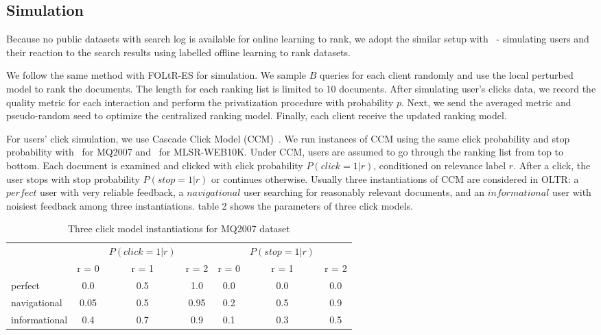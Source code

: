 \subsection{Simulation}

Because no public datasets with search log is available for online learning to rank, we adopt the similar setup with~\cite{DBLP:conf/wsdm/SchuthOWR16, DBLP:conf/wsdm/HofmannSWR13} - simulating users and their reaction to the search results using labelled offline learning to rank datasets.

We follow the same method with FOLtR-ES for simulation. We sample $B$ queries for each client randomly and use the local perturbed model to rank the documents. The length for each ranking list is limited to 10 documents. After simulating user's clicks data, we record the quality metric for each interaction and perform the privatization procedure with probability $p$. Next, we send the averaged metric and pseudo-random seed to optimize the centralized ranking model. Finally, each client receive the updated ranking model. 

For users' click simulation, we use Cascade Click Model (CCM)~\cite{DBLP:conf/wsdm/GuoLW09}. We run instances of CCM using the same click probability and stop probability with~\cite{kharitonov2019federated} for MQ2007 and~\cite{oosterhuis2016probabilistic} for MLSR-WEB10K. Under CCM, users are assumed to go through the ranking list from top to bottom. Each document is examined and clicked with click probability $P(click = 1 | r)$, conditioned on relevance label $r$. After a click, the user stops with stop probability $P(stop = 1 | r)$ or continues otherwise. Usually three instantiations of CCM are considered in OLTR: a $perfect$ user with very reliable feedback, a $navigational$ user searching for reasonably relevant documents, and an $informational$ user with noisiest feedback among three instantiations.  table 2 shows the parameters of three click models.

\begin{table}
	\caption{Three click model instantiations for MQ2007 dataset}
	\label{table:2:mq2007}
	\centering
	\begin{tabular}{l c c c c c c}
		\hline
		&&$P(click = 1 | r)$ &&& $P(stop = 1 | r)$  & \\
		& r = 0&  r = 1  & r = 2 & r = 0&  r = 1  & r = 2\\
		\midrule
		perfect  &   0.0  &    0.5  &    1.0 & 0.0 & 0.0 & 0.0   \\
		navigational  &  0.05  &   0.5  &    0.95  & 0.2 & 0.5 & 0.9  \\
		informational  &   0.4 &   0.7  &    0.9 & 0.1 & 0.3 & 0.5 \\
		\hline
	\end{tabular}
\end{table}

